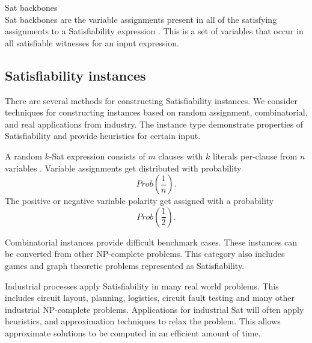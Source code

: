 \begin{definition}
{\sc Sat} backbones\\
{\sc Sat} backbones are the variable assignments present in all of the satisfying assignments to a {\sc Satisfiability} expression \cite{Zhang2001}.  This is a set of variables that occur in all satisfiable witnesses for an input expression.  

\end{definition}



	\subsection{{\sc Satisfiability} instances}
		
There are several methods for constructing {\sc Satisfiability} instances.  We consider techniques for constructing instances based on random assignment, combinatorial, and real applications from industry.  The instance type demonstrate properties of {\sc Satisfiability} and provide heuristics for certain input.
	
A random $k$-{\sc Sat} expression consists of $m$ clauses with $k$ literals per-clause from  $n$ variables \cite{wilsonKsat}. Variable assignments get distributed with probability 
\[
Prob\left(\frac{1}{n}\right).
\]
\noindent The positive or negative variable polarity get assigned with a probability 
\[
Prob\left(\frac{1}{2}\right).
\]


		

Combinatorial instances provide difficult benchmark cases.  These instances can be converted from other \textsf{NP-complete} problems.  This category also includes games and graph theoretic problems represented as {\sc Satisfiability}. 
		
		

Industrial processes apply {\sc Satisfiability} in many real world problems.  This includes circuit layout, planning, logistics, circuit fault testing and many other industrial \textsf{NP-complete} problems.  Applications for industrial {\sc Sat} will often apply heuristics, and approximation techniques to relax the problem.  This allows approximate solutions to be computed in an efficient amount of time.
		